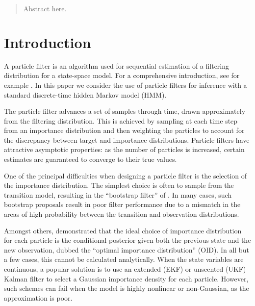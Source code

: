 \documentclass{article}
\begin{document}
\begin{abstract}
Abstract here.
\end{abstract}






\section{Introduction}

A particle filter is an algorithm used for sequential estimation of a filtering distribution for a state-space model. For a comprehensive introduction, see for example \citep{Cappe2007,Doucet2009}. In this paper we consider the use of particle filters for inference with a standard discrete-time hidden Markov model (HMM).

The particle filter advances a set of samples through time, drawn approximately from the filtering distribution. This is achieved by sampling at each time step from an importance distribution and then weighting the particles to account for the discrepancy between target and importance distributions. Particle filters have attractive asymptotic properties: as the number of particles is increased, certain estimates are guaranteed to converge to their true values. %

One of the principal difficulties when designing a particle filter is the selection of the importance distribution. The simplest choice is often to sample from the transition model, resulting in the ``bootstrap filter'' of \citep{Gordon1993}. In many cases, such bootstrap proposals result in poor filter performance due to a mismatch in the areas of high probability between the transition and observation distributions.

Amongst others, \citet{Doucet2000a} demonstrated that the ideal choice of importance distribution for each particle is the conditional posterior given both the previous state and the new observation, dubbed the ``optimal importance distribution'' (OID). In all but a few cases, this cannot be calculated analytically. When the state variables are continuous, a popular solution is to use an extended (EKF) or unscented (UKF) Kalman filter to select a Gaussian importance density for each particle. However, such schemes can fail when the model is highly nonlinear or non-Gaussian, as the approximation is poor.
\end{document}
